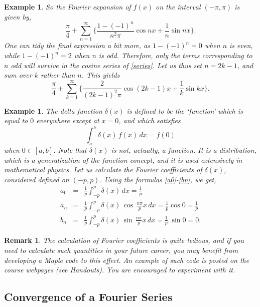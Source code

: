 \documentclass[12pt]{article}
\numberwithin{equation}{section}
\newtheorem{example}[theorem]{Example}
\newtheorem{remark}[theorem]{Remark}
\begin{document}
\begin{example}
So the Fourier expansion of $f(x)$ on the interval $(-\pi, \pi)$ is given
by,
\begin{equation} \label{series}
\frac{\pi}{4} + \sum _{n=1}^{\infty} \{ \frac{1-(-1)^n}{n^2\pi}\cos nx
+ \frac{1}{n} \sin nx \}.
\end{equation}
One can tidy the final expression a bit more, as $1-(-1)^n=0$ when $n$ is even, while  $1-(-1)^n=2$ when $n$ is odd. Therefore, only the terms corresponding to $n$ odd will survive in the cosine series of \eqref{series}. Let us thus set $n=2k-1$, and sum over $k$ rather than $n$. This yields
\begin{equation}  \label{series2}
\frac{\pi}{4} + \sum _{k=1}^{\infty} \{ \frac{2}{(2k-1)^2\pi}\cos (2k-1)x
+ \frac{1}{k} \sin kx \}.
\end{equation}
\end{example}

\vskip 1cm
\begin{example}
\normalfont
The {\em delta function} $\delta(x)$ is defined to be the `function' which is equal to $0$ everywhere except at $x=0$, and which satisfies
\[
\int_a^b \delta(x)\,f(x)\,dx= f(0)
\]
when $0 \in [a,b]$. Note that $\delta(x)$ is not, {\em actually}, a function. It is a {\em distribution}, which is a generalization of the function concept, and it is used extensively in mathematical physics. Let us calculate the Fourier coefficients of $\delta(x)$, considered defined on $(-p,p)$. Using the formulas \eqref{a0}-\eqref{bn}, we get,
\begin{eqnarray*}
a_0&=&\frac{1}{p}\int_{-p}^p \delta(x)\,dx=\frac{1}{p}\\
a_n&=&\frac{1}{p}\int_{-p}^p \delta (x)\,\cos\,\frac{n\pi}{p}x\,dx=\frac{1}{p}\cos 0=\frac{1}{p}\\
b_n&=&\frac{1}{p}\int_{-p}^p\delta(x)\,\sin\,\frac{n\pi}{p}x\,dx=\frac{1}{p}.\sin 0=0.
\end{eqnarray*}
\end{example}
\begin{remark}
\normalfont The calculation of Fourier coefficients is quite tedious, and if you need to calculate such quantities in your future career, you may benefit from developing a Maple code to this effect. An example of such code is posted on the course webpages (see Handouts). You are encouraged to experiment with it.
\end{remark}

\subsection{Convergence of a Fourier Series}
\end{document}
